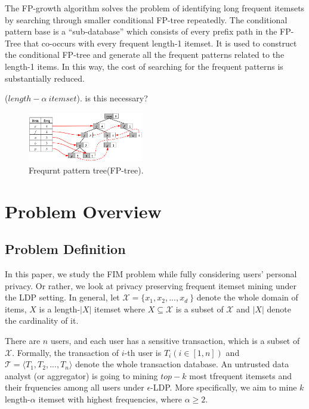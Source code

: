 \documentclass[conference]{IEEEtran}
\begin{document}
The FP-growth algorithm solves the problem of identifying long frequent itemsets by searching through smaller conditional FP-tree repeatedly. The conditional pattern base is a “sub-database” which consists of every prefix path in the FP-Tree that co-occurs with every frequent length-1 itemset. It is used to construct the conditional FP-tree and generate all the frequent patterns related to the length-1 items. In this way, the cost of searching for the frequent patterns is substantially reduced.

\begin{Definition}
($length-\alpha \ itemset$).  {\color{red} is this necessary? }
\end{Definition}

\begin{figure}[htbp]
\centerline{\includegraphics[width=0.45\textwidth]{fptree.png}}
\caption{Frequrnt pattern tree(FP-tree).}
\label{fptree}
\end{figure}

\section{Problem Overview}

\subsection{Problem Definition}
In this paper, we study the FIM problem while fully considering users' personal privacy. Or rather, we look at privacy preserving frequent itemset mining under the LDP setting. In general, let $\mathcal{X} = \{x_1,x_2,...,x_d\ \}$ denote the whole domain of items, $X$ is a length-$|X|$ itemset where $X \subseteq \mathcal{X}$ is a subset of $\mathcal{X}$ and $|X|$ denote the cardinality of it.

There are $n$ users, and each user has a sensitive transaction, which is a subset of $\mathcal{X}$. Formally, the transaction of $i$-th user is $T_i(i \in [1,n])$ and $\mathcal{T} = \langle T_1,T_2,...,T_n \rangle$ denote the whole transaction database. An untrusted data analyst (or aggregator) is going to mining $top-k$ most tfrequent itemsets and their frquencies among all users under $\epsilon$-LDP. More specifically, we aim to mine $k$ length-$\alpha$ itemset with highest frequencies, where $\alpha \geq 2$.
\end{document}
